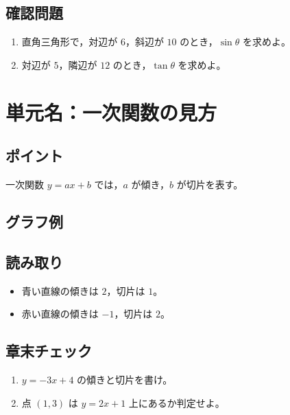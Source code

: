 \documentclass[paper=a4,fleqn]{jlreq}
\begin{document}
\subsection{確認問題}
\begin{enumerate}
  \item 直角三角形で，対辺が $6$，斜辺が $10$ のとき，$\sin\theta$ を求めよ。
  \item 対辺が $5$，隣辺が $12$ のとき，$\tan\theta$ を求めよ。
\end{enumerate}

\section{単元名：一次関数の見方}
\subsection{ポイント}
一次関数 $y=ax+b$ では，$a$ が傾き，$b$ が切片を表す。

\subsection{グラフ例}
\begin{center}
\end{center}

\subsection{読み取り}
\begin{itemize}
  \item 青い直線の傾きは $2$，切片は $1$。
  \item 赤い直線の傾きは $-1$，切片は $2$。
\end{itemize}

\subsection{章末チェック}
\begin{enumerate}
  \item $y=-3x+4$ の傾きと切片を書け。
  \item 点 $(1,3)$ は $y=2x+1$ 上にあるか判定せよ。
\end{enumerate}
\end{document}
